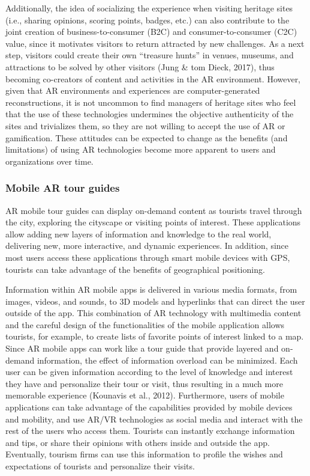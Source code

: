 \documentclass[
  letterpaper,
  DIV=11,
  numbers=noendperiod]{scrreprt}
\begin{document}
Additionally, the idea of socializing the experience when visiting
heritage sites (i.e., sharing opinions, scoring points, badges, etc.)
can also contribute to the joint creation of business-to-consumer (B2C)
and consumer-to-consumer (C2C) value, since it motivates visitors to
return attracted by new challenges. As a next step, visitors could
create their own ``treasure hunts'' in venues, museums, and attractions
to be solved by other visitors (Jung \& tom Dieck, 2017), thus becoming
co-creators of content and activities in the AR environment. However,
given that AR environments and experiences are computer-generated
reconstructions, it is not uncommon to find managers of heritage sites
who feel that the use of these technologies undermines the objective
authenticity of the sites and trivializes them, so they are not willing
to accept the use of AR or gamification. These attitudes can be expected
to change as the benefits (and limitations) of using AR technologies
become more apparent to users and organizations over time.

\hypertarget{mobile-ar-tour-guides}{%
\subsubsection{Mobile AR tour guides}\label{mobile-ar-tour-guides}}

AR mobile tour guides can display on-demand content as tourists travel
through the city, exploring the cityscape or visiting points of
interest. These applications allow adding new layers of information and
knowledge to the real world, delivering new, more interactive, and
dynamic experiences. In addition, since most users access these
applications through smart mobile devices with GPS, tourists can take
advantage of the benefits of geographical positioning.

Information within AR mobile apps is delivered in various media formats,
from images, videos, and sounds, to 3D models and hyperlinks that can
direct the user outside of the app. This combination of AR technology
with multimedia content and the careful design of the functionalities of
the mobile application allows tourists, for example, to create lists of
favorite points of interest linked to a map. Since AR mobile apps can
work like a tour guide that provide layered and on-demand information,
the effect of information overload can be minimized. Each user can be
given information according to the level of knowledge and interest they
have and personalize their tour or visit, thus resulting in a much more
memorable experience (Kounavis et al., 2012). Furthermore, users of
mobile applications can take advantage of the capabilities provided by
mobile devices and mobility, and use AR/VR technologies as social media
and interact with the rest of the users who access them. Tourists can
instantly exchange information and tips, or share their opinions with
others inside and outside the app. Eventually, tourism firms can use
this information to profile the wishes and expectations of tourists and
personalize their visits.
\end{document}
